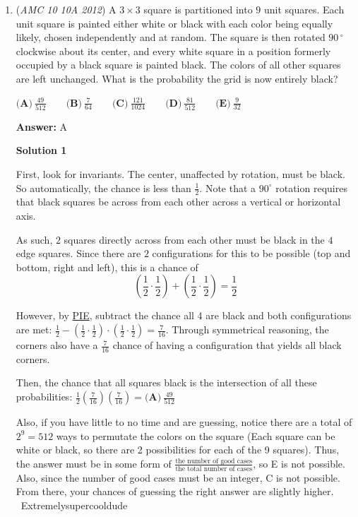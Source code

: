 \begin{enumerate}
	\item (\textit{AMC 10 10A 2012}) A $3 \times 3$ square is partitioned into $9$ unit squares. Each unit square is painted either white or black with each color being equally likely, chosen independently and at random. The square is then rotated $90\,^{\circ}$ clockwise about its center, and every white square in a position formerly occupied by a black square is painted black. The colors of all other squares are left unchanged. What is the probability the grid is now entirely black?


 $\textbf{(A)}\ \frac{49}{512}\qquad\textbf{(B)}\ \frac{7}{64}\qquad\textbf{(C)}\ \frac{121}{1024}\qquad\textbf{(D)}\ \frac{81}{512}\qquad\textbf{(E)}\ \frac{9}{32}$

 \textbf{Answer: }A



\textbf{Solution 1}

First, look for invariants. The center, unaffected by rotation, must be black. So automatically, the chance is less than $\frac{1}{2}.$ Note that a $90^{\circ}$ rotation requires that black squares be across from each other across a vertical or horizontal axis. 

 
As such, $2$ squares directly across from each other must be black in the $4$ edge squares. Since there are $2$ configurations for this to be possible (top and bottom, right and left), this is a chance of
 \[\left (\frac{1}{2} \cdot \frac{1}{2} \right )+ \left (\frac{1}{2} \cdot \frac{1}{2} \right )=\frac{1}{2}\] 

 
However, by \href{https://artofproblemsolving.com/wiki/index.php?title=PIE}{PIE}, subtract the chance all 4 are black and both configurations are met: $\frac{1}{2}- \left (\frac{1}{2} \cdot \frac{1}{2} \right ) \cdot \left (\frac{1}{2} \cdot \frac{1}{2} \right )=\frac{7}{16}$. Through symmetrical reasoning, the corners also have a $\frac{7}{16}$ chance of having a configuration that yields all black corners. 

 Then, the chance that all squares black is the intersection of all these probabilities: $\frac{1}{2} \left (\frac{7}{16} \right ) \left (\frac{7}{16} \right ) = \boxed{\textbf{(A)}\ \frac{49}{512}}$ 

 


 Also, if you have little to no time and are guessing, notice there are a total of $2^9 = 512$ ways to permutate the colors on the square (Each square can be white or black, so there are 2 possibilities for each of the 9 squares). Thus, the answer must be in some form of $\frac{\text{the number of good cases}}{\text{the total number of cases}}$, so E is not possible. Also, since the number of good cases must be an integer, C is not possible. From there, your chances of guessing the right answer are slightly higher. ~Extremelysupercooldude


\end{enumerate}
